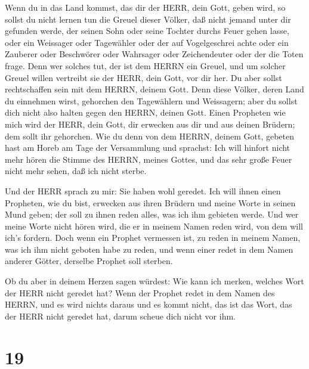  Wenn du in das Land kommst, das dir der HERR, dein Gott,
geben wird, so sollst du nicht lernen tun die Greuel dieser Völker,
 daß nicht jemand unter dir gefunden werde, der seinen Sohn
oder seine Tochter durchs Feuer gehen lasse, oder ein Weissager oder
Tagewähler oder der auf Vogelgeschrei achte oder ein Zauberer
 oder Beschwörer oder Wahrsager oder Zeichendeuter oder der
die Toten frage.  Denn wer solches tut, der ist dem HERRN
ein Greuel, und um solcher Greuel willen vertreibt sie der HERR, dein
Gott, vor dir her.  Du aber sollst rechtschaffen sein mit
dem HERRN, deinem Gott.  Denn diese Völker, deren Land du
einnehmen wirst, gehorchen den Tagewählern und Weissagern; aber du
sollst dich nicht also halten gegen den HERRN, deinen Gott.
 Einen Propheten wie mich wird der HERR, dein Gott, dir
erwecken aus dir und aus deinen Brüdern; dem sollt ihr gehorchen.
 Wie du denn von dem HERRN, deinem Gott, gebeten hast am
Horeb am Tage der Versammlung und sprachst: Ich will hinfort nicht mehr
hören die Stimme des HERRN, meines Gottes, und das sehr große Feuer
nicht mehr sehen, daß ich nicht sterbe.

 Und der HERR sprach zu mir: Sie haben wohl geredet.
 Ich will ihnen einen Propheten, wie du bist, erwecken aus
ihren Brüdern und meine Worte in seinen Mund geben; der soll zu ihnen
reden alles, was ich ihm gebieten werde.  Und wer meine
Worte nicht hören wird, die er in meinem Namen reden wird, von dem will
ich's fordern.  Doch wenn ein Prophet vermessen ist, zu
reden in meinem Namen, was ich ihm nicht geboten habe zu reden, und wenn
einer redet in dem Namen anderer Götter, derselbe Prophet soll sterben.

 Ob du aber in deinem Herzen sagen würdest: Wie kann ich
merken, welches Wort der HERR nicht geredet hat?  Wenn der
Prophet redet in dem Namen des HERRN, und es wird nichts daraus und es
kommt nicht, das ist das Wort, das der HERR nicht geredet hat, darum
scheue dich nicht vor ihm.

\hypertarget{section-18}{%
\section{19}\label{section-18}}

